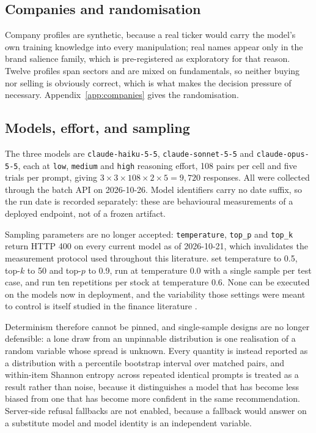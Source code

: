 \subsection{Companies and randomisation}
\ifsubmission
Company profiles are synthetic, because a real ticker would carry the model's
own training knowledge into every manipulation; real names appear only in the
brand salience family, which is pre-registered as exploratory for that
reason. Twelve profiles span sectors and are mixed on fundamentals, so
neither buying nor selling is obviously correct, which is what makes the
decision pressure of  necessary.
Appendix~\ref{app:companies} gives the randomisation.
\else

\fi

\subsection{Models, effort, and sampling}
\label{sec:models}
The three models are \texttt{claude-haiku-5-5}, \texttt{claude-sonnet-5-5}
and \texttt{claude-opus-5-5}, each at \texttt{low}, \texttt{medium} and
\texttt{high} reasoning effort, 108 pairs per cell and five trials per
prompt, giving $3 \times 3 \times 108 \times 2 \times 5 = 9{,}720$ responses.
All were collected through the batch API on 2026-10-26. Model identifiers
carry no date suffix, so the run date is recorded separately: these are
behavioural measurements of a deployed endpoint, not of a frozen artifact.

Sampling parameters are no longer accepted: \texttt{temperature},
\texttt{top\_p} and \texttt{top\_k} return HTTP 400 on every current model as
of 2026-10-21, which invalidates the measurement protocol used throughout
this literature. \citet{bini2026behavioral} set temperature to 0.5, top-$k$
to 50 and top-$p$ to 0.9, \citet{malberg2025comprehensive} run at temperature
0.0 with a single sample per test case, and \citet{lee2025yourai} run ten
repetitions per stock at temperature 0.6. None can be executed on the models
now in deployment, and the variability those settings were meant to control
is itself studied in the finance literature \citep{chon2025variability}.

Determinism therefore cannot be pinned, and single-sample designs are no
longer defensible: a lone draw from an unpinnable distribution is one
realisation of a random variable whose spread is unknown. Every quantity is
instead reported as a distribution with a percentile bootstrap interval over
matched pairs, and within-item Shannon entropy across repeated identical
prompts is treated as a result rather than noise, because it distinguishes a
model that has become less biased from one that has become more confident in
the same recommendation. Server-side refusal fallbacks are not enabled,
because a fallback would answer on a substitute model and model identity is
an independent variable.

